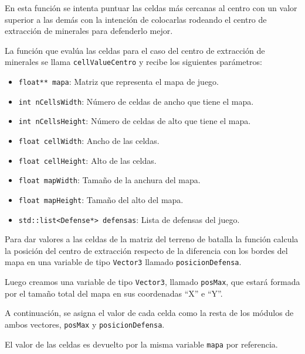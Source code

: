 En esta función se intenta puntuar las celdas más cercanas al centro con un valor superior a las demás con la intención de colocarlas rodeando el centro de extracción de minerales para defenderlo mejor.

La función que evalúa las celdas para el caso del centro de extracción de minerales se llama \texttt{cellValueCentro} y recibe los siguientes parámetros:
\begin{itemize}
	\item \texttt{float** mapa}: Matriz que representa el mapa de juego.
	\item \texttt{int nCellsWidth}: Número de celdas de ancho que tiene el mapa.
	\item \texttt{int nCellsHeight}: Número de celdas de alto que tiene el mapa.
	\item \texttt{float cellWidth}: Ancho de las celdas.
	\item \texttt{float cellHeight}: Alto de las celdas.
	\item \texttt{float mapWidth}: Tamaño de la anchura del mapa.
	\item \texttt{float mapHeight}: Tamaño del alto del mapa.
	\item \texttt{std::list<Defense*> defensas}: Lista de defensas del juego.
\end{itemize}
Para dar valores a las celdas de la matriz del terreno de batalla la función calcula la posición del centro de extracción respecto de la diferencia con los bordes del mapa en una variable de tipo \texttt{Vector3} llamado \texttt{posicionDefensa}.

Luego creamos una variable de tipo \texttt{Vector3}, llamado \texttt{posMax}, que estará formada por el tamaño total del mapa en sus coordenadas ``X'' e ``Y''.

A continuación, se asigna el valor de cada celda como la resta de los módulos de ambos vectores, \texttt{posMax} y \texttt{posicionDefensa}.

El valor de las celdas es devuelto por la misma variable \texttt{mapa} por referencia.
